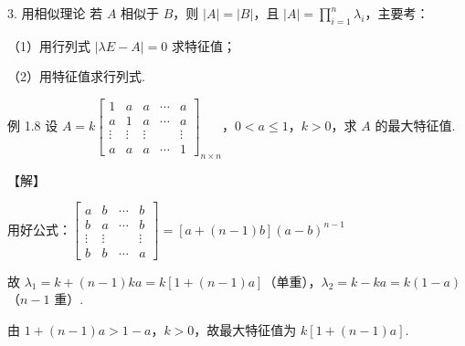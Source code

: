 \begin{fcard}{3. 用相似理论}
若 $A$ 相似于 $B$，则 $|A|=|B|$，且 $|A|=\prod\limits_{i=1}^{n}\lambda_i$，主要考：

（1）用行列式 $|\lambda E-A|=0$ 求特征值；

（2）用特征值求行列式.
\end{fcard}

\begin{fcard}{例 1.8}
设 $A=k\begin{bmatrix}
1 & a & a & \cdots & a\\
a & 1 & a & \cdots & a\\
\vdots & \vdots & \vdots & & \vdots\\
a & a & a & \cdots & 1
\end{bmatrix}_{n\times n}$，$0<a\leqslant 1$，$k>0$，求 $A$ 的最大特征值.

【解】

用好公式：$\begin{bmatrix}a & b & \cdots & b\\ b & a & \cdots & b\\ \vdots & \vdots & & \vdots\\ b & b & \cdots & a\end{bmatrix}=[a+(n-1)b](a-b)^{n-1}$

故 $\lambda_1=k+(n-1)ka=k[1+(n-1)a]$（单重），$\lambda_2=k-ka=k(1-a)$（$n-1$ 重）.

由 $1+(n-1)a>1-a$，$k>0$，故最大特征值为 $k[1+(n-1)a]$.
\end{fcard}
